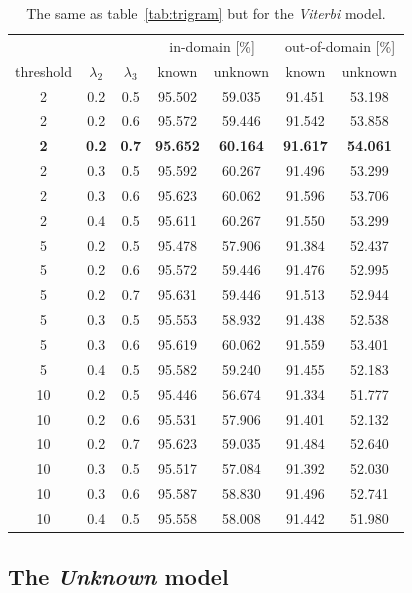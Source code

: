 \documentclass[11pt]{article}
\begin{document}
\begin{table}[phtb]
\begin{center}
\begin{tabular}{c cc cccc}
\toprule
&&& \multicolumn{2}{c}{in-domain [\%]} & \multicolumn{2}{c}{out-of-domain [\%]}\\
threshold & $\lambda_2$ & $\lambda_3$ & known & unknown & known & unknown \\\midrule
2 & 0.2 & 0.5 & 95.502 & 59.035 & 91.451 & 53.198\\
2 & 0.2 & 0.6 & 95.572 & 59.446 & 91.542 & 53.858\\
{\bf 2} & {\bf 0.2} & {\bf 0.7} & {\bf 95.652} & {\bf 60.164} & {\bf 91.617} &
{\bf 54.061}\\
2 & 0.3 & 0.5 & 95.592 & 60.267 & 91.496 & 53.299\\
2 & 0.3 & 0.6 & 95.623 & 60.062 & 91.596 & 53.706\\
2 & 0.4 & 0.5 & 95.611 & 60.267 & 91.550 & 53.299\\
5 & 0.2 & 0.5 & 95.478 & 57.906 & 91.384 & 52.437\\
5 & 0.2 & 0.6 & 95.572 & 59.446 & 91.476 & 52.995\\
5 & 0.2 & 0.7 & 95.631 & 59.446 & 91.513 & 52.944\\
5 & 0.3 & 0.5 & 95.553 & 58.932 & 91.438 & 52.538\\
5 & 0.3 & 0.6 & 95.619 & 60.062 & 91.559 & 53.401\\
5 & 0.4 & 0.5 & 95.582 & 59.240 & 91.455 & 52.183\\
10 & 0.2 & 0.5 & 95.446 & 56.674 & 91.334 & 51.777\\
10 & 0.2 & 0.6 & 95.531 & 57.906 & 91.401 & 52.132\\
10 & 0.2 & 0.7 & 95.623 & 59.035 & 91.484 & 52.640\\
10 & 0.3 & 0.5 & 95.517 & 57.084 & 91.392 & 52.030\\
10 & 0.3 & 0.6 & 95.587 & 58.830 & 91.496 & 52.741\\
10 & 0.4 & 0.5 & 95.558 & 58.008 & 91.442 & 51.980\\
\bottomrule
\end{tabular}
\end{center}
\caption{%
The same as table~\ref{tab:trigram} but for the \emph{Viterbi} model.
\label{tab:viterbi}}
\end{table}

\subsection{The \emph{Unknown} model}
\end{document}
